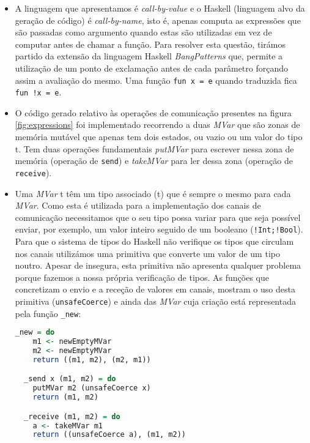 \begin{itemize}
\item  A linguagem que apresentamos é \textit{call-by-value} e o Haskell (linguagem alvo da geração de código) é \textit{call-by-name}, isto é, apenas computa as expressões que são passadas como argumento quando estas são utilizadas em vez de computar antes de chamar a função. Para resolver esta questão, tirámos partido da extensão da linguagem Haskell \textit{BangPatterns} que, permite a utilização de um ponto de exclamação antes de cada parâmetro forçando assim a avaliação do mesmo. Uma função \lstinline"fun x = e" quando traduzida fica \lstinline"fun !x = e".
\newline
\item O código gerado relativo às operações de comunicação presentes na figura \ref{fig:expressions} foi implementado recorrendo a duas \textit{MVar} que são zonas de memória mutável que apenas tem dois estados, ou vazio ou um valor do tipo t. Tem duas operações fundamentais \textit{putMVar} para escrever nessa zona de memória (operação de \lstinline"send") e \textit{takeMVar} para ler dessa zona (operação de \lstinline"receive").
\newline
\item Uma \textit{MVar} t têm um tipo associado (t) que é sempre o mesmo para cada \textit{MVar}. Como esta é utilizada para a implementação dos canais de comunicação necessitamos que o seu tipo possa variar para que seja possível enviar, por exemplo, um valor inteiro seguido de um booleano (\lstinline"!Int;!Bool"). Para que o sistema de tipos do Haskell não verifique os tipos que circulam nos canais utilizámos uma primitiva que converte um valor de um tipo noutro. Apesar de insegura, esta primitiva não apresenta qualquer problema porque fazemos a nossa própria verificação de tipos.
  As funções que concretizam o envio e a receção de valores em canais, mostram o uso desta primitiva (\lstinline|unsafeCoerce|) e ainda das \textit{MVar} cuja criação está representada pela função \lstinline|_new|:
\begin{lstlisting}[language=Haskell, style=eclipse]
  _new = do
    m1 <- newEmptyMVar
    m2 <- newEmptyMVar
    return ((m1, m2), (m2, m1))

  _send x (m1, m2) = do
    putMVar m2 (unsafeCoerce x)
    return (m1, m2)

  _receive (m1, m2) = do
    a <- takeMVar m1
    return ((unsafeCoerce a), (m1, m2))
\end{lstlisting}


\end{itemize}
